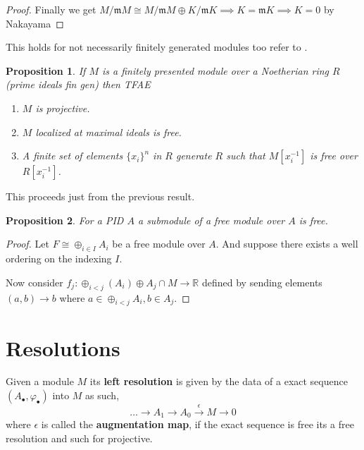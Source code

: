 \documentclass[12pt]{article}
\numberwithin{equation}{section}
\newcommand{\R}{\mathbb{R}}
\newtheorem{proposition}{Proposition}[section]
\begin{document}
\begin{appendices}
\begin{proof}
		Finally we get $M/\mathfrak{m}M \cong M/\mathfrak{m}M \oplus K/\mathfrak{m}K\implies K=\mathfrak{m}K \implies K=0$ by Nakayama
	\end{proof}
	This holds for not necessarily finitely generated modules too refer to \cite[Th.~2.5]{matsumura_1987}	.
	\begin{proposition} If $M$ is a finitely presented module over a Noetherian ring $R$ (prime ideals fin gen) then TFAE
		\begin{enumerate}
			\item $M$ is projective.
			\item $M$ localized at maximal ideals is free.
			\item A finite set of elements $\{x_i\}^n$ in $R$ generate $R$ such that $M[x_i^{-1}]$ is free over $R[x_i^{-1}]$.
		\end{enumerate}		
	\end{proposition}
	This proceeds just from the previous result.
	
	\begin{proposition}\label{submodoffreemodisfreepid}
		For a PID $A$ a submodule of a free module over $A$ is free.
	\end{proposition}
	\begin{proof}
		Let $F \cong \oplus_{i \in I} A_i$ be a free module over $A$. And suppose there exists a well ordering on the indexing $I$.
		
		Now consider $f_j : \oplus_{i< j} (A_i) \oplus A_j \cap M \to \R $ defined by sending elements $(a,b) \to b$ where $a \in \oplus_{i<j}A_i, b \in A_j$.
	\end{proof}
	\section{Resolutions}
	Given a module $M$ its \textbf{left resolution} is given by the data of a exact sequence $(A_\bullet, \varphi_\bullet)$ into $M$ as such,
	\[ 	\dots \to A_1	\to A_0 \xrightarrow{\epsilon} M \to 0 \]
	where $\epsilon $ is called the \textbf{augmentation map}, if the exact sequence is free its a free resolution and such for projective. 
	

\end{appendices}
\end{document}
